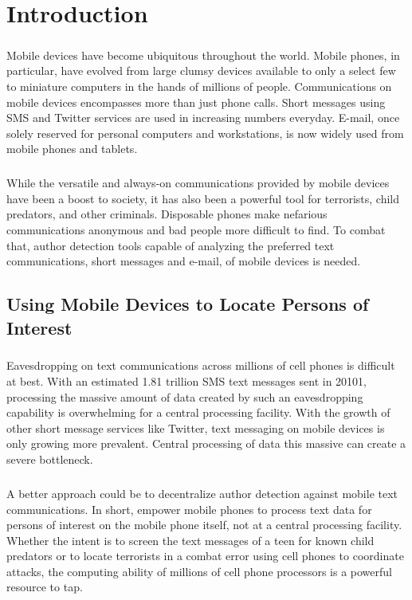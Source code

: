 \chapter{Introduction}
\paragraph*{} Mobile devices have become ubiquitous throughout the world.  Mobile phones, in particular, have evolved from large clumsy devices available to only a select few to miniature computers in the hands of millions of people.  Communications on mobile devices encompasses more than just phone calls.  Short messages using SMS and Twitter services are used in increasing numbers everyday.  E-mail, once solely reserved for personal computers and workstations, is now widely used from mobile phones and tablets.
\paragraph*{} While the versatile and always-on communications provided by mobile devices have been a boost to society, it has also been a powerful tool for terrorists, child predators, and other criminals.  Disposable phones make nefarious communications anonymous and bad people more difficult to find.  To combat that, author detection tools capable of analyzing the preferred text communications, short messages and e-mail, of mobile devices is needed.

\section{Using Mobile Devices to Locate Persons of Interest}
\paragraph*{} Eavesdropping on text communications across millions of cell phones is difficult at best.  With an estimated 1.81 trillion SMS text messages sent in 20101, processing the massive amount of data created by such an eavesdropping capability is overwhelming for a central processing facility.  With the growth of other short message services like Twitter, text messaging on mobile devices is only growing more prevalent. Central processing of data this massive can create a severe bottleneck.
\paragraph*{} A better approach could be to decentralize author detection against mobile text communications. In short, empower mobile phones to process text data for persons of interest on the mobile phone itself, not at a central processing facility.  Whether the intent is to screen the text messages of a teen for known child predators or to locate terrorists in a combat error using cell phones to coordinate attacks, the computing ability of millions of cell phone processors is a powerful resource to tap.
